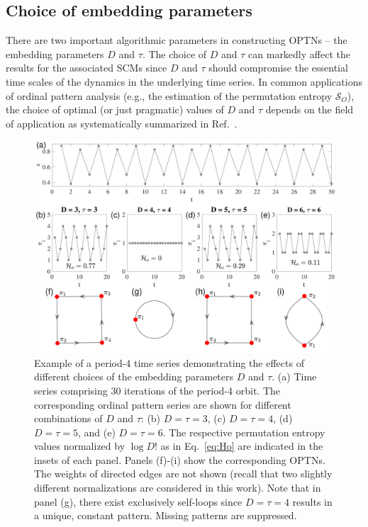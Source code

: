 \documentclass[12pt,aip,cha,reprint,nofootinbib]{revtex4-1}
\begin{document}
\subsection{Choice of embedding parameters} \label{sec:embeddings}
There are two important algorithmic parameters in constructing OPTNs -- the embedding parameters $D$ and $\tau$. The choice of $D$ and $\tau$ can markedly affect the results for the associated SCMs since $D$ and $\tau$ should compromise the essential time scales of the dynamics in the underlying time series. In common applications of ordinal pattern analysis (e.g., the estimation of the permutation entropy $\mathcal{S}_O$), the choice of optimal (or just pragmatic) values of $D$ and $\tau$ depends on the field of application as systematically summarized in Ref.~\cite{Riedl2013}.

\begin{figure}
	\centering 
	\includegraphics[width=2\columnwidth]{period4_logisticExample.pdf}
\caption{\small{Example of a period-4 time series demonstrating the effects of different choices of the embedding parameters $D$ and $\tau$. (a) Time series comprising 30 iterations of the period-4 orbit. The corresponding ordinal pattern series are shown for different combinations of $D$ and $\tau$: (b) $D = \tau = 3$, (c) $D = \tau = 4$, (d) $D = \tau = 5$, and (e) $D = \tau = 6$. The respective permutation entropy values normalized by $\log D!$ as in Eq.~\eqref{eq:Ho} are indicated in the insets of each panel. Panels (f)-(i) show the corresponding OPTNs. The weights of directed edges are not shown (recall that two slightly different normalizations are considered in this work). Note that in panel (g), there exist exclusively self-loops since $D = \tau = 4$ results in a unique, constant pattern. Missing patterns are suppressed.}
\label{fig:embed}}
\end{figure}
\end{document}
